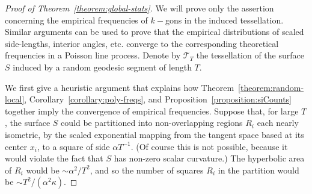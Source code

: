 \documentclass[10pt]{amsart}
\theoremstyle{definition}\newtheorem{defi}[theo]{Definition}\newtheorem{rema}[theo]{Remark}\newtheorem{exam}[theo]{Example}\newtheorem{exem}[theo]{Example}\newtheorem{nota}[theo]{Notation}
\begin{document}
\begin{proof}
[Proof of Theorem~\ref{theorem:global-stats}] We will prove only the assertion concerning the empirical frequencies of $k-$gons in the induced tessellation. Similar arguments can be used to prove that the empirical distributions of scaled side-lengths, interior angles, etc. converge to the corresponding theoretical frequencies in a Poisson line process. Denote by $\mathcal{T}_{T}$ the tessellation of the surface $S$ induced by a random geodesic segment of length $T$.

We first give a heuristic argument that explains how Theorem~\ref{theorem:random-local}, Corollary~\ref{corollary:poly-freqs}, and Proposition~\ref{proposition:siCounts} together imply the convergence of empirical frequencies. Suppose that, for large $T$, the surface $S$ could be partitioned into non-overlapping regions $R_{i}$ each nearly isometric, by the scaled exponential mapping from the tangent space based at its center $x_{i}$, to a square of side $\alpha T^{-1}$. (Of course this is not possible, because it would violate the fact that $S$ has non-zero scalar curvature.) The hyperbolic area of $R_{i}$ would be $\sim \alpha^{2}/T^{2}$, and so the number of squares $R_{i}$ in the partition would be $\sim T^{2}/ (\alpha^{2}\kappa)$.


\end{proof}
\end{document}

